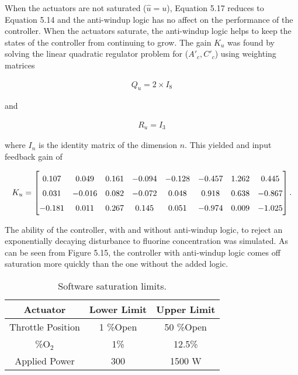 \noindent When the actuators are not saturated ($\hat{u} = u$), Equation 5.17 reduces to Equation 5.14 and
the anti-windup logic has no affect on the performance of the controller. When the actuators
saturate, the anti-windup logic helps to keep the states of the controller from continuing to
grow. The gain $K_{u}$ was found by solving the linear quadratic regulator problem for ($A'_{c}, C'_{c}$)
using weighting matrices

\begin{align}
	Q_{u} = 2 \times I_{8}
\end{align}

\noindent and

\begin{align}
	R_{u} = I_{3}
\end{align}

\noindent where $I_{n}$ is the identity matrix of the dimension $n$. This yielded and input feedback gain of

\begin{align}
	K_{u} = \renewcommand\arraystretch{1.5} \begin{bmatrix}
		0.107 & 0.049 & 0.161 & -0.094 & -0.128 & -0.457 & 1.262 & 0.445 \\ 0.031 & -0.016 & 0.082 & -0.072 & 0.048 & 0.918 & 0.638 & -0.867 \\ -0.181 & 0.011 & 0.267 & 0.145 & 0.051 & -0.974 & 0.009 & -1.025
	\end{bmatrix}.
\end{align}

\noindent The ability of the controller, with and without anti-windup logic, to reject an exponentially
decaying disturbance to fluorine concentration was simulated. As can be seen from Figure 5.15, the controller with anti-windup logic comes off saturation more quickly than the one without the added logic.


\begin{table}[H]
	\centering
	\renewcommand\arraystretch{1.5}
	\begin{tabular}{|c|c|c|}
		\hline
		Actuator & Lower Limit & Upper Limit\\
		\hline
		Throttle Position & 1 \%Open & 50 \%Open \\
		\hline
		\%$\text{O}_{2}$ & 1\% & 12.5\% \\
		\hline
		Applied Power & 300 & 1500 W \\
		\hline 
	\end{tabular}
	\bf\caption{Software saturation limits.}
	\label{table:5.2}
\end{table}

